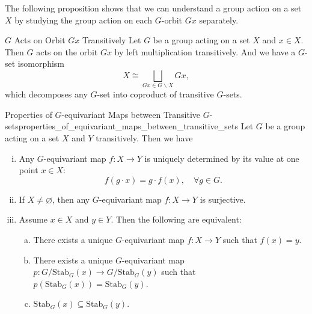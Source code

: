 The following proposition shows that we can understand a group action on a set $X$ by studying the group action on each $G$-orbit $Gx$ separately.

\begin{proposition}{$G$ Acts on Orbit $Gx$ Transitively}{}
    Let $G$ be a group acting on a set $X$ and $x\in X$. Then $G$ acts on the orbit $Gx$ by left multiplication transitively. And we have a $G$-set isomorphism
    \[
        X\cong \bigsqcup_{Gx\in G\backslash X}Gx,
    \]
    which decomposes any $G$-set into coproduct of transitive $G$-sets.
\end{proposition}

\begin{proposition}{Properties of $G$-equivariant Maps between Transitive $G$-sets}{properties_of_equivariant_maps_between_transitive_sets}
    Let $G$ be a group acting on a set $X$ and $Y$ transitively. Then we have
    \begin{enumerate}[(i)]
        \item Any $G$-equivariant map $f:X\to Y$ is uniquely determined by its value at one point $x\in X$:
                \[
                    f(g\cdot x)=g\cdot f( x),\quad \forall g\in G.
                \]
        \item If $X\ne \varnothing$, then any $G$-equivariant map $f:X\to Y$ is surjective.
        \item Assume $x\in X$ and $y\in Y$. Then the following are equivalent:
        \begin{enumerate}[a)]
            \item There exists a unique $G$-equivariant map $f:X\to Y$ such that $f(x)=y$.
            \item There exists a unique $G$-equivariant map $p:G/\mathrm{Stab}_G(x)\to G/\mathrm{Stab}_G(y)$ such that $p(\mathrm{Stab}_G(x))=\mathrm{Stab}_G(y)$.
            \item $\mathrm{Stab}_G(x)\subseteq \mathrm{Stab}_G(y)$.
        \end{enumerate}
    \end{enumerate}
\end{proposition}
